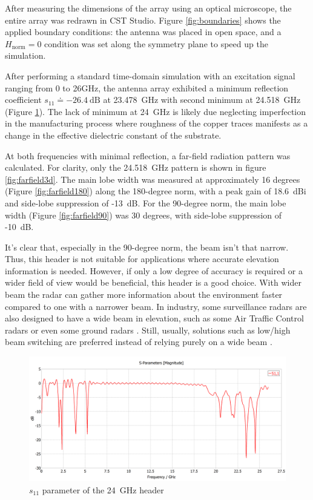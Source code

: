 After measuring the dimensions of the array using an optical microscope, the entire array was redrawn in CST Studio.
Figure \ref{fig:boundaries} shows the applied boundary conditions: the antenna was placed in open space, and a  $H_\mathrm{norm}=0$ condition was set along the symmetry plane to speed up the simulation.

After performing a standard time-domain simulation with an excitation signal ranging from 0 to 26GHz, the antenna array exhibited a minimum reflection coefficient $s_{11} \doteq -26.4 \mathrm{~dB}$ at 23.478~GHz with second minimum at 24.518~GHz (Figure \ref{fig:s11}).
The lack of minimum at 24~GHz is likely due neglecting imperfection in the manufacturing process where roughness of the copper traces manifests as a change in the effective dielectric constant of the substrate.

At both frequencies with minimal reflection, a far-field radiation pattern was calculated.
For clarity, only the 24.518~GHz pattern is shown in figure \ref{fig:farfield3d}.
The main lobe width was measured at approximately 16 degrees (Figure \ref{fig:farfield180}) along the 180-degree norm, with a peak gain of 18.6~dBi and side-lobe suppression of -13~dB.
For the 90-degree norm, the main lobe width (Figure \ref{fig:farfield90}) was 30 degrees, with side-lobe suppression of -10~dB.

It's clear that, especially in the 90-degree norm, the beam isn't that narrow.
Thus, this header is not suitable for applications where accurate elevation information is needed.
However, if only a low degree of accuracy is required or a wider field of view would be beneficial, this header is a good choice.
With wider beam  the radar can gather more information about the environment faster compared to one with a narrower beam.
In industry, some surveillance radars are also designed to have a wide beam in elevation, such as some Air Traffic Control radars \cite{kratos} or even some ground radars \cite{blighter}.
Still, usually, solutions such as low/high beam switching are preferred instead of relying purely on a wide beam \cite{wolfBeam}.

\begin{figure}[h!]
  \centering
  \includegraphics[width=\textwidth]{../img/s11.png}
  \caption[$s_{11}$ parameter of the 24~GHz header]{$s_{11}$ parameter of the 24~GHz header}
  \label{fig:s11}
\end{figure}


